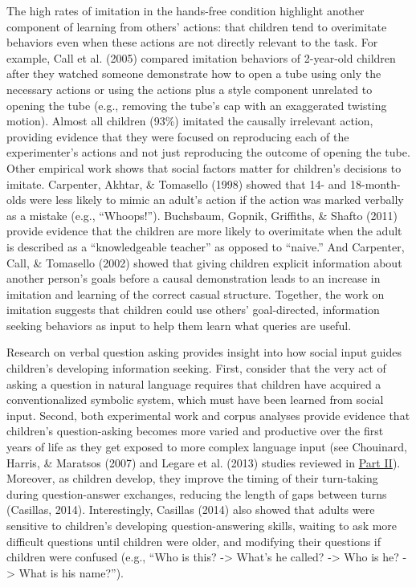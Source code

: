 \documentclass[oneside]{report}
\begin{document}
The high rates of imitation in the hands-free condition highlight
another component of learning from others' actions: that children tend
to overimitate behaviors even when these actions are not directly
relevant to the task. For example, Call et al. (2005) compared imitation
behaviors of 2-year-old children after they watched someone demonstrate
how to open a tube using only the necessary actions or using the actions
plus a style component unrelated to opening the tube (e.g., removing the
tube's cap with an exaggerated twisting motion). Almost all children
(93\%) imitated the causally irrelevant action, providing evidence that
they were focused on reproducing each of the experimenter's actions and
not just reproducing the outcome of opening the tube. Other empirical
work shows that social factors matter for children's decisions to
imitate. Carpenter, Akhtar, \& Tomasello (1998) showed that 14- and
18-month-olds were less likely to mimic an adult's action if the action
was marked verbally as a mistake (e.g., ``Whoops!''). Buchsbaum, Gopnik,
Griffiths, \& Shafto (2011) provide evidence that the children are more
likely to overimitate when the adult is described as a ``knowledgeable
teacher'' as opposed to ``naive.'' And Carpenter, Call, \& Tomasello
(2002) showed that giving children explicit information about another
person's goals before a causal demonstration leads to an increase in
imitation and learning of the correct casual structure. Together, the
work on imitation suggests that children could use others'
goal-directed, information seeking behaviors as input to help them learn
what queries are useful.

Research on verbal question asking provides insight into how social
input guides children's developing information seeking. First, consider
that the very act of asking a question in natural language requires that
children have acquired a conventionalized symbolic system, which must
have been learned from social input. Second, both experimental work and
corpus analyses provide evidence that children's question-asking becomes
more varied and productive over the first years of life as they get
exposed to more complex language input (see Chouinard, Harris, \&
Maratsos (2007) and Legare et al. (2013) studies reviewed in
\protect\hyperlink{p2}{Part II}). Moreover, as children develop, they
improve the timing of their turn-taking during question-answer
exchanges, reducing the length of gaps between turns (Casillas, 2014).
Interestingly, Casillas (2014) also showed that adults were sensitive to
children's developing question-answering skills, waiting to ask more
difficult questions until children were older, and modifying their
questions if children were confused (e.g., ``Who is this?
-\textgreater{} What's he called? -\textgreater{} Who is he?
-\textgreater{} What is his name?'').
\end{document}
